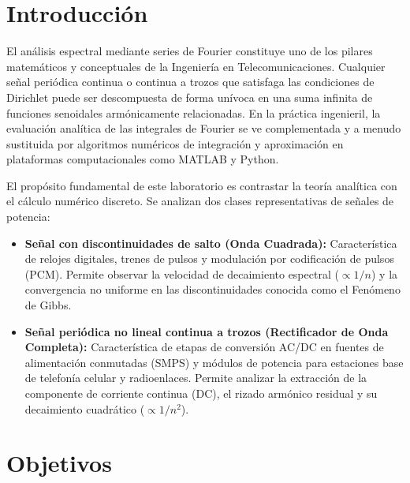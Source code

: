 \documentclass[11pt,a4paper]{article}
\begin{document}
\vspace{0.5cm}
\tableofcontents
\newpage

\section{Introducción}
El análisis espectral mediante series de Fourier constituye uno de los pilares matemáticos y conceptuales de la Ingeniería en Telecomunicaciones. Cualquier señal periódica continua o continua a trozos que satisfaga las condiciones de Dirichlet puede ser descompuesta de forma unívoca en una suma infinita de funciones senoidales armónicamente relacionadas. En la práctica ingenieril, la evaluación analítica de las integrales de Fourier se ve complementada y a menudo sustituida por algoritmos numéricos de integración y aproximación en plataformas computacionales como MATLAB y Python.

El propósito fundamental de este laboratorio es contrastar la teoría analítica con el cálculo numérico discreto. Se analizan dos clases representativas de señales de potencia:
\begin{itemize}[leftmargin=*]
    \item \textbf{Señal con discontinuidades de salto (Onda Cuadrada):} Característica de relojes digitales, trenes de pulsos y modulación por codificación de pulsos (PCM). Permite observar la velocidad de decaimiento espectral ($\propto 1/n$) y la convergencia no uniforme en las discontinuidades conocida como el Fenómeno de Gibbs.
    \item \textbf{Señal periódica no lineal continua a trozos (Rectificador de Onda Completa):} Característica de etapas de conversión AC/DC en fuentes de alimentación conmutadas (SMPS) y módulos de potencia para estaciones base de telefonía celular y radioenlaces. Permite analizar la extracción de la componente de corriente continua (DC), el rizado armónico residual y su decaimiento cuadrático ($\propto 1/n^2$).
\end{itemize}

\section{Objetivos}
\end{document}
